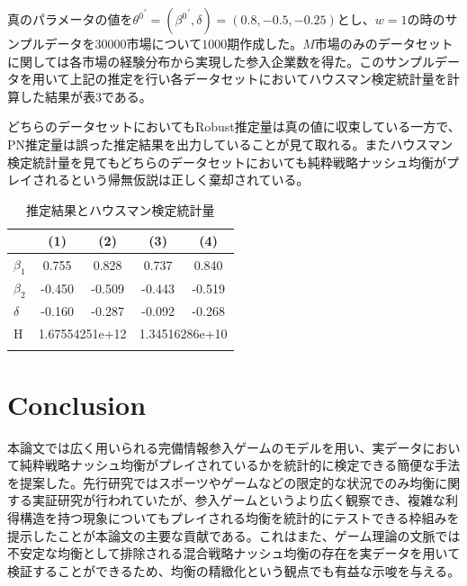 \documentclass{jsarticle}
\begin{document}
真のパラメータの値を${\theta^0}^{'} = ({\beta^0}^{'}, \delta) = (0.8, -0.5, -0.25)$とし、$w = 1$の時のサンプルデータを$30000$市場について$1000$期作成した。$M$市場のみのデータセットに関しては各市場の経験分布から実現した参入企業数を得た。このサンプルデータを用いて上記の推定を行い各データセットにおいてハウスマン検定統計量を計算した結果が表$3$である。

どちらのデータセットにおいてもRobust推定量は真の値に収束している一方で、PN推定量は誤った推定結果を出力していることが見て取れる。またハウスマン検定統計量を見てもどちらのデータセットにおいても純粋戦略ナッシュ均衡がプレイされるという帰無仮説は正しく棄却されている。

\begin{table}[t]
\begin{minipage}{\textwidth}
\centering
\def\sym#1{\ifmmode^{#1}\else\(^{#1}\)\fi}
\caption{推定結果とハウスマン検定統計量}
\begin{tabular}{l*{4}{c}}
\hline\hline
            &\multicolumn{1}{c}{(1)}&\multicolumn{1}{c}{(2)}&\multicolumn{1}{c}{(3)}&\multicolumn{1}{c}{(4)}\\
\hline
$\beta_1$&        0.755         &       0.828        &      0.737  &     0.840  \\
[1em]
$\beta_2$      &        -0.450          &       -0.509        &       -0.443        &       -0.519         \\
[1em]
$\delta$&        -0.160         &       -0.287        &       -0.092         &       -0.268        \\
\hline
H      &        \multicolumn{2}{c}{1.67554251e+12}       &         \multicolumn{2}{c}{1.34516286e+10}        \\
\hline\hline\\
\end{tabular}
\end{minipage}
\end{table}

\section{Conclusion}
本論文では広く用いられる完備情報参入ゲームのモデルを用い、実データにおいて純粋戦略ナッシュ均衡がプレイされているかを統計的に検定できる簡便な手法を提案した。先行研究ではスポーツやゲームなどの限定的な状況でのみ均衡に関する実証研究が行われていたが、参入ゲームというより広く観察でき、複雑な利得構造を持つ現象についてもプレイされる均衡を統計的にテストできる枠組みを提示したことが本論文の主要な貢献である。これはまた、ゲーム理論の文脈では不安定な均衡として排除される混合戦略ナッシュ均衡の存在を実データを用いて検証することができるため、均衡の精緻化という観点でも有益な示唆を与える。
\end{document}
